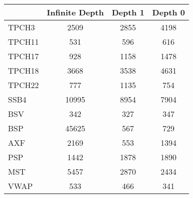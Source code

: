 \begin{tabular}{|l|c|c|c|}\hline 
\ & Infinite Depth & Depth 1 & Depth 0 \\\hline 
TPCH3 & 2509 & 2855 & 4198 \\\hline
TPCH11 & 531 & 596 & 616 \\\hline
TPCH17 & 928 & 1158 & 1478 \\\hline
TPCH18 & 3668 & 3538 & 4631 \\\hline
TPCH22 & 777 & 1135 & 754 \\\hline
SSB4 & 10995 & 8954 & 7904 \\\hline
BSV & 342 & 327 & 347 \\\hline
BSP & 45625 & 567 & 729 \\\hline
AXF & 2169 & 553 & 1394 \\\hline
PSP & 1442 & 1878 & 1890 \\\hline
MST & 5457 & 2870 & 2434 \\\hline
VWAP & 533 & 466 & 341 \\\hline
\end{tabular}